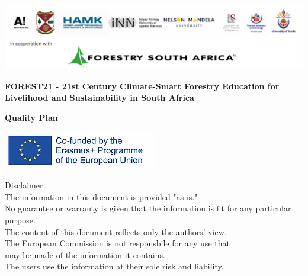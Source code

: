 \documentclass[
  11pt,
]{article}
\author{}
\date{\vspace{-2.5em}}
\begin{document}
\subsectionfont{\raggedright}
\subsubsectionfont{\raggedright}

\thispagestyle{empty}

\begin{centering}

\vspace{3cm}


\includegraphics[width=1\linewidth]{Partner_logos} 

\vspace{3cm}

\Large
{\bf FOREST21 - 21st Century Climate-Smart Forestry Education for Livelihood
  and Sustainability in South Africa}
  
\vspace{2cm}

\Large
{\bf Quality Plan}

\vspace{4cm}

\normalsize
\singlespacing


\includegraphics[width=1\linewidth]{EU_logo} 

\vspace{0.5 cm}

Disclaimer:\\
The information in this document is provided "as is."\\
No guarantee or warranty is given that the information is fit for any particular purpose.\\
The content of this document reflects only the authors' view.\\
The European Commission is not responsbile for any use that\\
may be made of the information it contains.\\
The users use the information at their sole risk and liability.

\vspace{1.5 cm}

\end{centering}
\end{document}
